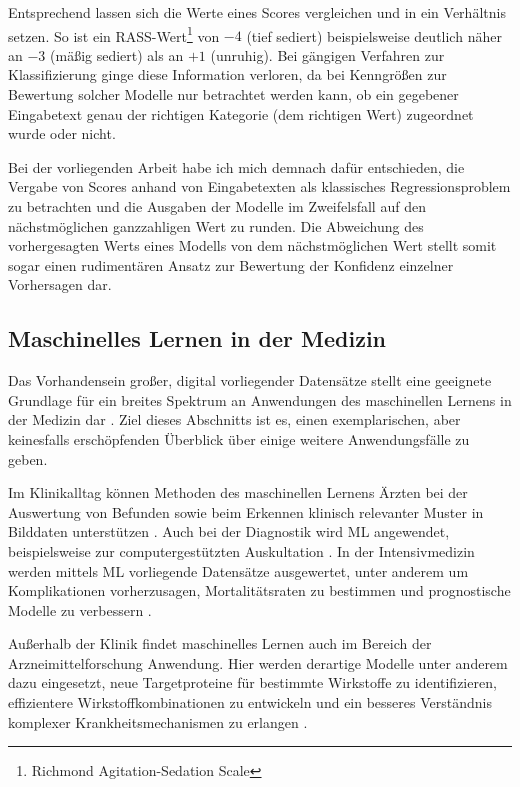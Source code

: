 Entsprechend lassen sich die Werte eines Scores vergleichen und in ein Verhältnis setzen. So ist ein RASS-Wert\footnote{Richmond Agitation-Sedation Scale} von $-4$ (tief sediert) beispielsweise deutlich näher an $-3$ (mäßig sediert) als an $+1$ (unruhig). Bei gängigen Verfahren zur Klassifizierung ginge diese Information verloren, da bei Kenngrößen zur Bewertung solcher Modelle nur betrachtet werden kann, ob ein gegebener Eingabetext genau der richtigen Kategorie (dem richtigen Wert) zugeordnet wurde oder nicht. 

Bei der vorliegenden Arbeit habe ich mich demnach dafür entschieden, die Vergabe von Scores anhand von Eingabetexten als klassisches Regressionsproblem zu betrachten und die Ausgaben der Modelle im Zweifelsfall auf den nächstmöglichen ganzzahligen Wert zu runden. Die Abweichung des vorhergesagten Werts eines Modells von dem nächstmöglichen Wert stellt somit sogar einen rudimentären Ansatz zur Bewertung der Konfidenz einzelner Vorhersagen dar. %

\subsection{Maschinelles Lernen in der Medizin}
Das Vorhandensein großer, digital vorliegender Datensätze stellt eine geeignete Grundlage für ein breites Spektrum an Anwendungen des maschinellen Lernens in der Medizin dar \citep{chenHowDevelopMachine2019}. Ziel dieses Abschnitts ist es, einen exemplarischen, aber keinesfalls erschöpfenden Überblick über einige weitere Anwendungsfälle zu geben.

Im Klinikalltag können Methoden des maschinellen Lernens Ärzten bei der Auswertung von Befunden sowie beim Erkennen klinisch relevanter Muster in Bilddaten unterstützen \citep{shahArtificialIntelligenceMachine2019}. Auch bei der Diagnostik wird ML angewendet, beispielsweise zur computergestützten Auskultation \citep{reedHeartSoundAnalysis2004}. In der Intensivmedizin werden mittels ML vorliegende Datensätze ausgewertet, unter anderem um Komplikationen vorherzusagen, Mortalitätsraten zu bestimmen und prognostische Modelle zu verbessern \citep{shillanUseMachineLearning2019, krishnanSupervisedLearningApproach2018}.

Außerhalb der Klinik findet maschinelles Lernen auch im Bereich der Arzneimittelforschung Anwendung. Hier werden derartige Modelle unter anderem dazu eingesetzt, neue Targetproteine für bestimmte Wirkstoffe zu identifizieren, effizientere Wirkstoffkombinationen zu entwickeln und ein besseres Verständnis komplexer Krankheitsmechanismen zu erlangen \citep{vamathevanApplicationsMachineLearning2019}.

